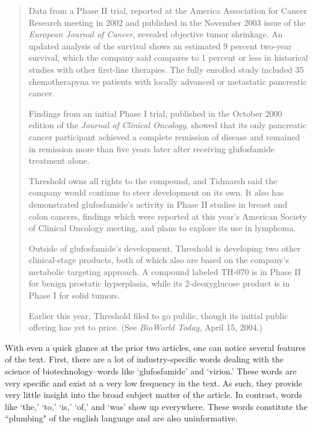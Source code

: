 \begin{singlespace}
\begin{small}
\begin{quotation}
Data from a Phase II trial, reported at the America Association for Cancer Research meeting in 2002 and published in the November 2003 issue of the \emph{European Journal of Cancer}, revealed objective tumor shrinkage. An updated analysis of the survival shows an estimated 9 percent two-year survival, which the company said compares to 1 percent or less in historical studies with other first-line therapies. The fully enrolled study included 35 chemotherapyna ve patients with locally advanced or metastatic pancreatic cancer.  

Findings from an initial Phase I trial, published in the October 2000 edition of the \emph{Journal of Clinical Oncology}, showed that its only pancreatic cancer participant achieved a complete remission of disease and remained in remission more than five years later after receiving glufosfamide treatment alone.

Threshold owns all rights to the compound, and Tidmarsh said the company would continue to steer development on its own. It also has demonstrated glufosfamide's activity in Phase II studies in breast and colon cancers, findings which were reported at this year's American Society of Clinical Oncology meeting, and plans to explore its use in lymphoma.

Outside of glufosfamide's development, Threshold is developing two other clinical-stage products, both of which also are based on the company's metabolic targeting approach. A compound labeled TH-070 is in Phase II for benign prostatic hyperplasia, while its 2-deoxyglucose product is in Phase I for solid tumors.

Earlier this year, Threshold filed to go public, though its initial public offering has yet to price. (See \emph{BioWorld Today}, April 15, 2004.) 
\end{quotation}
\end{small}
\end{singlespace}

With even a quick glance at the prior two articles, one can notice several features of the text. First, there are a lot of industry-specific words dealing with the science of biotechnology--words like `glufosfamide' and `virion.' These words are very specific and exist at a very low frequency in the text. As such, they provide very little insight into the broad subject matter of the article. In contrast, words like `the,' `to,' `is,' `of,' and `was' show up everywhere. These words constitute the ``plumbing" of the english language and are also uninformative.

